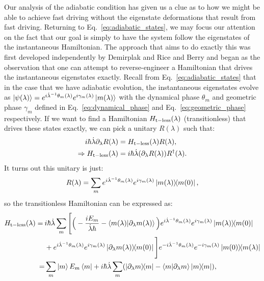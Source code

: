     Our analysis of the adiabatic condition has given us a clue as to how we might be able to achieve fast driving without the eigenstate deformations that result from fast driving. Returning to Eq.~\eqref{eq:adiabatic_states}, we may focus our attention on the fact that our goal is simply to have the system follow the eigenstates of the instantaneous Hamiltonian. The approach that aims to do exactly this was first developed independently by Demirplak and Rice \cite{demirplak_adiabatic_2003} and Berry \cite{berry_transitionless_2009} and began as the observation that one can attempt to reverse-engineer a Hamiltonian that drives the instantaneous eigenstates exactly. Recall from Eq.~\eqref{eq:adiabatic_states} that in the case that we have adiabatic evolution, the instantaneous eigenstates evolve as $\ket{\psi(\lambda)} = e^{i \dot{\lambda}^{-1} \theta_m(\lambda)}e^{i \gamma_m(\lambda)} \ket{m(\lambda)}$ with the dynamical phase $\theta_m$ and geometric phase $\gamma_m$ defined in Eq.~\eqref{eq:dynamical_phase} and Eq.~\eqref{eq:geometric_phase} respectively. If we want to find a Hamiltonian $H_{\rm t-less} (\lambda)$ (transitionless) that drives these states exactly, we can pick a unitary $R(\lambda)$ such that:
    \begin{equation}
        \begin{aligned}
            i\hbar \dot{\lambda} \partial_{\lambda} R(\lambda) &= H_{\rm t-less} (\lambda) R(\lambda), \\
            \Rightarrow H_{\rm t-less} (\lambda) &= i\hbar \dot{\lambda} (\partial_{\lambda} R(\lambda)) R^{\dagger}(\lambda).
        \end{aligned}
    \end{equation}
    It turns out this unitary is just:
    \begin{equation}\label{eq:transitionless_unitary}
        R(\lambda) = \sum_m e^{i \dotlambda^{-1} \theta_m(\lambda)}e^{i \gamma_m(\lambda)} \dyad{m(\lambda)}{m(0)},
    \end{equation}
    so the transitionless Hamiltonian can be expressed as:
    \begin{equation}
        \begin{aligned}\label{eq:transitionless_hamiltonian}
            \begin{aligned}
                H_{\rm t-less}(\lambda) = \: &i \hbar \dotlambda \sum_m \Bigg[ \Big(- \frac{i E_m}{\dotlambda \hbar} - \braket{m(\lambda)}{\dlambda m(\lambda)}\Big) e^{i \dotlambda^{-1} \theta_m(\lambda)}e^{i \gamma_m(\lambda)} \dyad{m(\lambda)}{m(0)} \\
                &+ e^{i \dotlambda^{-1} \theta_m(\lambda)}e^{i \gamma_m(\lambda)} \dyad{\dlambda m(\lambda)}{m(0)} \Bigg] e^{-i \dotlambda^{-1} \theta_m(\lambda)}e^{-i \gamma_m(\lambda)} \dyad{m(0)}{m(\lambda)} \\
                 = &\sum_m \ket{m} E_m \bra{m} + i\hbar \dotlambda \sum_m (\dyad{\dlambda m}{m} - \braket{m}{\dlambda m} \dyad{m}),
            \end{aligned}
        \end{aligned}
    \end{equation}
